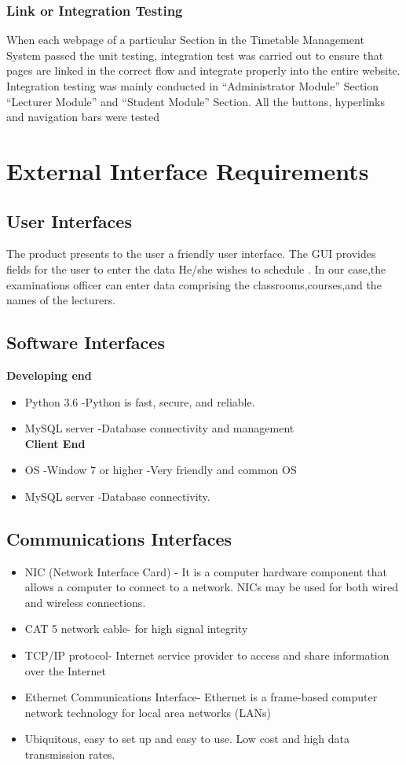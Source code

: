 \documentclass{scrreprt}
\begin{document}
\subsection{Link or Integration Testing}
When each webpage of a particular Section in the Timetable Management System
passed the unit testing, integration test was carried out to ensure that pages are linked in
the correct flow and integrate properly into the entire website. Integration testing was
mainly conducted in “Administrator Module” Section “Lecturer Module” and “Student
Module” Section. All the buttons, hyperlinks and navigation bars were tested
 
\chapter{External Interface Requirements}

\section{User Interfaces}
The product presents to the user a friendly user interface. The GUI provides fields for the user to enter the data He/she wishes to schedule . In our case,the examinations officer can enter data comprising the classrooms,courses,and the names of the lecturers.

 

\section{Software Interfaces} 
\textbf{Developing end}
\begin{itemize}  
\item Python 3.6 -Python  is fast, secure, and reliable. 
\item MySQL server -Database connectivity and management\\
\textbf{Client End}\\
\item OS -Window 7 or higher -Very friendly and common OS
\item MySQL server -Database connectivity.
\end{itemize}

\section{Communications Interfaces}
\begin{itemize}
 \item NIC (Network Interface Card) - It is a computer hardware component that allows a computer to
connect to a network. NICs may be used for both wired and wireless connections.
\item CAT 5 network cable- for high signal integrity
\item  TCP/IP protocol- Internet service provider to access and share information over the
Internet
\item Ethernet Communications Interface- Ethernet is a frame-based computer network
technology for local area networks (LANs)
\item Ubiquitous, easy to set up and easy to use. Low cost and high data transmission rates.
\end {itemize}
\end{document}
